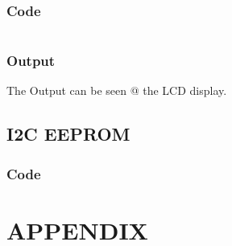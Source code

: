 \documentclass[oneside]{book}
\begin{document}
\subsection{Code}
\inputminted[bgcolor=black]{c}{./programFiles/SPILCD.c}

\subsection{Output}
\quad The Output can be seen @ the LCD display.


\section{I2C EEPROM}
\subsection{Code}







\chapter{APPENDIX}
\end{document}
